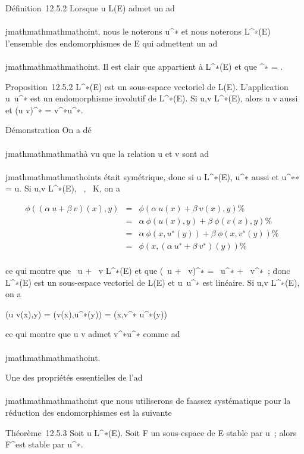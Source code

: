 Définition~12.5.2 Lorsque u \in L(E) admet un ad\\\\jmathmathmathmathoint, nous le noterons
u^∗ et nous noterons L^∗(E) l'ensemble des
endomorphismes de E qui admettent un ad\\\\jmathmathmathmathoint. Il est clair que
\mathrmIdE appartient à L^∗(E)
et que \mathrmId^∗ =
\mathrmId.

Proposition~12.5.2 L^∗(E) est un sous-espace vectoriel de
L(E). L'application u\mapsto~u^∗ est un
endomorphisme involutif de L^∗(E). Si u,v \in
L^∗(E), alors u \cdot v aussi et (u \cdot v)^∗ =
v^∗\cdot u^∗.

Démonstration On a dé\\\\jmathmathmathmathà vu que la relation u et v sont ad\\\\jmathmathmathmathoints était
symétrique, donc si u \in L^∗(E), u^∗ aussi et
u^∗∗ = u. Si u,v \in L^∗(E), \alpha~,\beta~ \in K, on a

\begin{align*} \phi((\alpha~u + \beta~v)(x),y)& =& \phi(\alpha~u(x) +
\beta~v(x),y) \%& \\ & =& \alpha~\phi(u(x),y) +
\beta~\phi(v(x),y) \%& \\ & =&
\alpha~\phi(x,u^∗(y)) + \beta~\phi(x,v^∗(y))\%&
\\ & =& \phi(x,(\alpha~u^∗ +
\beta~v^∗)(y)) \%& \\
\end{align*}

ce qui montre que \alpha~u + \beta~v \in L^∗(E) et que (\alpha~u +
\beta~v)^∗ = \alpha~u^∗ + \beta~v^∗~; donc
L^∗(E) est un sous-espace vectoriel de L(E) et
u\mapsto~u^∗ est linéaire. Si u,v \in
L^∗(E), on a

\phi(u \cdot v(x),y) = \phi(v(x),u^∗(y)) = \phi(x,v^∗\cdot
u^∗(y))

ce qui montre que u \cdot v admet v^∗\cdot u^∗ comme
ad\\\\jmathmathmathmathoint.

Une des propriétés essentielles de l'ad\\\\jmathmathmathmathoint que nous utiliserons de
fa\ccon assez systématique pour la réduction des
endomorphismes est la suivante

Théorème~12.5.3 Soit u \in L^∗(E). Soit F un sous-espace de E
stable par u~; alors F^\bot est stable par u^∗.

